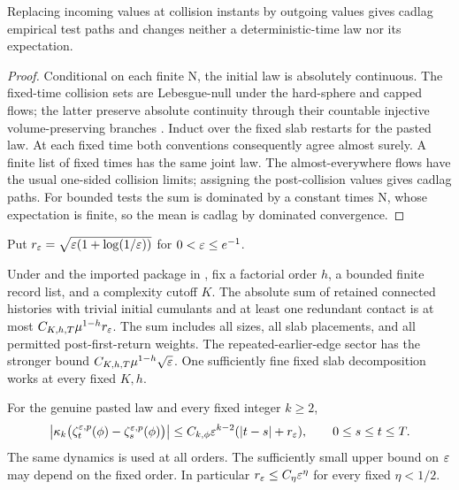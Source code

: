 \begin{lemma}\label{lem:convention}
Replacing incoming values at collision instants by outgoing values gives
cadlag empirical test paths and changes neither a deterministic-time law
nor its expectation.
\end{lemma}
\begin{proof}
Conditional on each finite N, the initial law is absolutely continuous.
The fixed-time collision sets are Lebesgue-null under the hard-sphere and
capped flows; the latter preserve absolute continuity through their
countable injective volume-preserving branches
\cite[Appendix A, proof of Proposition 4.5, items (1) and (5)]{DHM}.
Induct over the fixed slab restarts for the pasted law. At each fixed time
both conventions consequently agree almost surely. A finite list of fixed
times has the same joint law. The almost-everywhere flows have the usual
one-sided collision limits; assigning the post-collision values gives
cadlag paths. For bounded tests the sum is dominated by a constant times N,
whose expectation is finite, so the mean is cadlag by dominated convergence.
\end{proof}
Put $r_\varepsilon=\sqrt{\varepsilon(1+\log(1/\varepsilon))}$ for $0<\varepsilon\leq e^{-1}$.

\begin{theorem}\label{thm:cycles}
Under  and the imported package in
, fix a factorial order $h$, a bounded finite record
list, and a complexity cutoff $K$.
The absolute sum of retained connected histories with trivial initial
cumulants and at least one redundant contact is at most
$C_{K,h,T}\mu^{1-h}r_\varepsilon$.
The sum includes all sizes, all slab placements, and all permitted
post-first-return weights. The repeated-earlier-edge sector has the
stronger bound $C_{K,h,T}\mu^{1-h}\sqrt{\varepsilon}$.
One sufficiently fine fixed slab decomposition works at every fixed
$K,h$.
\end{theorem}

\begin{theorem}\label{thm:increments}
For the genuine pasted law and every fixed integer $k\geq2$,
\[
 \left|\kappa_k\bigl(\zeta_t^{\varepsilon,p}(\phi)
                      -\zeta_s^{\varepsilon,p}(\phi)\bigr)\right|
 \leq C_{k,\phi}\varepsilon^{k-2}(|t-s|+r_\varepsilon),
 \qquad 0\leq s\leq t\leq T.
\]
The same dynamics is used at all orders. The sufficiently small upper
bound on $\varepsilon$ may depend on the fixed order.
In particular $r_\varepsilon\leq C_\eta\varepsilon^\eta$ for every fixed $\eta<1/2$.
\end{theorem}

